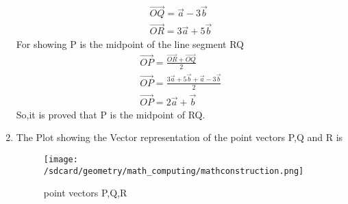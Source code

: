 \documentclass{article}
\begin{document}
\begin{enumerate}
\begin{align}
        \vec{OQ}=\vec{a}-3\vec{b}\\
        \Vec{OR}=3\Vec{a}+5\Vec{b}
    \end{align}
    For showing P is the midpoint of the line segment RQ
    \begin{align}
        \Vec{OP}=\frac{\Vec{OR}+\vec{OQ}}{2}\\
        \Vec{OP}=\frac{3\Vec{a}+5\Vec{b}+\vec{a}-3\Vec{b}}{2}\\
        \Vec{OP}=2\Vec{a}+\Vec{b}
    \end{align}
    So,it is proved that P is the midpoint of RQ.
    \item The Plot showing the Vector representation of the point vectors P,Q and R is
    \begin{figure}[!ht]
        \centering
        \texttt{[image: /sdcard/geometry/math\_computing/mathconstruction.png]}
        \caption{point vectors P,Q,R}
        \label{fig:enter-label}
    \end{figure}
\end{enumerate}
\end{document}

